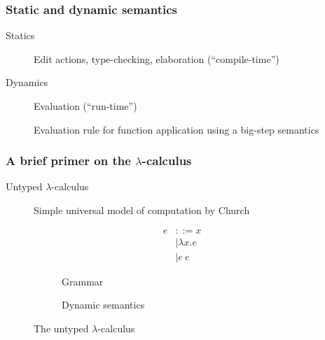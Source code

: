\documentclass{beamer}
\begin{document}
\begin{frame}
  \frametitle{Static and dynamic semantics}

  \begin{description}
  \item[Statics] Edit actions, type-checking, elaboration (``compile-time'')
  \item[Dynamics] Evaluation (``run-time'')
  \end{description}

  \begin{figure}
    \centering
    \begin{mathpar}
    \end{mathpar}
    \caption{Evaluation rule for function application using a big-step semantics}
    \label{fig:inference-rules}
  \end{figure}
\end{frame}

\begin{frame}
  \frametitle{A brief primer on the $\lambda$-calculus}

  \begin{description}
  \item[Untyped $\lambda$-calculus] Simple universal model of computation by Church
  \end{description}

  \begin{figure}
    \centering
    \begin{subfigure}[b]{.2\textwidth}
        \begin{align*}
          e &::= x\\
            &\mid \lambda x.e\\
            &\mid e\ e
        \end{align*}
      \caption{Grammar}
    \end{subfigure}\qquad
    \begin{subfigure}[b]{.7\textwidth}
      
      \caption{Dynamic semantics}
    \end{subfigure}
    \caption{The untyped $\lambda$-calculus}
    \label{fig:ulc}
  \end{figure}
\end{frame}
\end{document}
